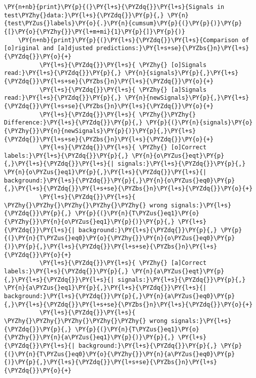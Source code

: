 \begin{notebookcell}[]
\begin{addmargin}[\cellleftmargin]{0em}
{\begin{Verbatim}[commandchars=\\\{\}]
    \PY{n+nb}{print}\PY{p}{(}\PY{l+s}{\PYZdq{}}\PY{l+s}{Signals in test\PYZhy{}data:}\PY{l+s}{\PYZdq{}}\PY{p}{,} \PY{n}{test\PYZus{}labels}\PY{o}{.}\PY{n}{cumsum}\PY{p}{(}\PY{p}{)}\PY{p}{[}\PY{o}{\PYZhy{}}\PY{l+m+mi}{1}\PY{p}{]}\PY{p}{)}
    \PY{n+nb}{print}\PY{p}{(}\PY{l+s}{\PYZdq{}}\PY{l+s}{Comparison of [o]riginal and [a]djusted predictions:}\PY{l+s+se}{\PYZbs{}n}\PY{l+s}{\PYZdq{}}\PY{o}{+}
          \PY{l+s}{\PYZdq{}}\PY{l+s}{ \PYZhy{} [o]Signals read:}\PY{l+s}{\PYZdq{}}\PY{p}{,} \PY{n}{signals}\PY{p}{,}\PY{l+s}{\PYZdq{}}\PY{l+s+se}{\PYZbs{}n}\PY{l+s}{\PYZdq{}}\PY{o}{+}
          \PY{l+s}{\PYZdq{}}\PY{l+s}{ \PYZhy{} [a]Signals read:}\PY{l+s}{\PYZdq{}}\PY{p}{,} \PY{n}{newSignals}\PY{p}{,}\PY{l+s}{\PYZdq{}}\PY{l+s+se}{\PYZbs{}n}\PY{l+s}{\PYZdq{}}\PY{o}{+}
          \PY{l+s}{\PYZdq{}}\PY{l+s}{ \PYZhy{}\PYZhy{} Difference:}\PY{l+s}{\PYZdq{}}\PY{p}{,} \PY{p}{(}\PY{n}{signals}\PY{o}{\PYZhy{}}\PY{n}{newSignals}\PY{p}{)}\PY{p}{,}\PY{l+s}{\PYZdq{}}\PY{l+s+se}{\PYZbs{}n}\PY{l+s}{\PYZdq{}}\PY{o}{+}
          \PY{l+s}{\PYZdq{}}\PY{l+s}{ \PYZhy{} [o]Correct labels:}\PY{l+s}{\PYZdq{}}\PY{p}{,} \PY{n}{o\PYZus{}eqt}\PY{p}{,}\PY{l+s}{\PYZdq{}}\PY{l+s}{| signals:}\PY{l+s}{\PYZdq{}}\PY{p}{,} \PY{n}{o\PYZus{}eq1}\PY{p}{,}\PY{l+s}{\PYZdq{}}\PY{l+s}{| background:}\PY{l+s}{\PYZdq{}}\PY{p}{,}\PY{n}{o\PYZus{}eq0}\PY{p}{,}\PY{l+s}{\PYZdq{}}\PY{l+s+se}{\PYZbs{}n}\PY{l+s}{\PYZdq{}}\PY{o}{+}
          \PY{l+s}{\PYZdq{}}\PY{l+s}{ \PYZhy{}\PYZhy{}\PYZhy{}\PYZhy{}\PYZhy{} wrong signals:}\PY{l+s}{\PYZdq{}}\PY{p}{,} \PY{p}{(}\PY{n}{T\PYZus{}eq1}\PY{o}{\PYZhy{}}\PY{n}{o\PYZus{}eq1}\PY{p}{)}\PY{p}{,} \PY{l+s}{\PYZdq{}}\PY{l+s}{| background:}\PY{l+s}{\PYZdq{}}\PY{p}{,} \PY{p}{(}\PY{n}{T\PYZus{}eq0}\PY{o}{\PYZhy{}}\PY{n}{o\PYZus{}eq0}\PY{p}{)}\PY{p}{,}\PY{l+s}{\PYZdq{}}\PY{l+s+se}{\PYZbs{}n}\PY{l+s}{\PYZdq{}}\PY{o}{+}
          \PY{l+s}{\PYZdq{}}\PY{l+s}{ \PYZhy{} [a]Correct labels:}\PY{l+s}{\PYZdq{}}\PY{p}{,} \PY{n}{a\PYZus{}eqt}\PY{p}{,}\PY{l+s}{\PYZdq{}}\PY{l+s}{| signals:}\PY{l+s}{\PYZdq{}}\PY{p}{,} \PY{n}{a\PYZus{}eq1}\PY{p}{,}\PY{l+s}{\PYZdq{}}\PY{l+s}{| background:}\PY{l+s}{\PYZdq{}}\PY{p}{,}\PY{n}{a\PYZus{}eq0}\PY{p}{,}\PY{l+s}{\PYZdq{}}\PY{l+s+se}{\PYZbs{}n}\PY{l+s}{\PYZdq{}}\PY{o}{+}
          \PY{l+s}{\PYZdq{}}\PY{l+s}{ \PYZhy{}\PYZhy{}\PYZhy{}\PYZhy{}\PYZhy{} wrong signals:}\PY{l+s}{\PYZdq{}}\PY{p}{,} \PY{p}{(}\PY{n}{T\PYZus{}eq1}\PY{o}{\PYZhy{}}\PY{n}{a\PYZus{}eq1}\PY{p}{)}\PY{p}{,} \PY{l+s}{\PYZdq{}}\PY{l+s}{| background:}\PY{l+s}{\PYZdq{}}\PY{p}{,} \PY{p}{(}\PY{n}{T\PYZus{}eq0}\PY{o}{\PYZhy{}}\PY{n}{a\PYZus{}eq0}\PY{p}{)}\PY{p}{,}\PY{l+s}{\PYZdq{}}\PY{l+s+se}{\PYZbs{}n}\PY{l+s}{\PYZdq{}}\PY{o}{+}

\end{Verbatim}}
\end{addmargin}
\end{notebookcell}

